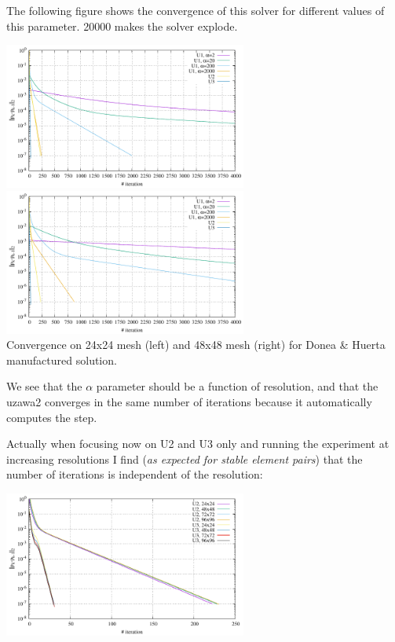 The following figure shows the convergence of this solver for different values of this parameter.
20000 makes the solver explode.	

\begin{center}
\includegraphics[width=8cm]{python_codes/fieldstone_147/RESULTS/uzawa123/convergence_24x24.pdf}
\includegraphics[width=8cm]{python_codes/fieldstone_147/RESULTS/uzawa123/convergence_48x48.pdf}\\
{\captionfont Convergence on 24x24 mesh (left) and 48x48 mesh (right) 
for Donea \& Huerta manufactured solution.}
\end{center}

We see that the $\alpha$ parameter should be a function of resolution, and that 
the uzawa2 converges in the same number of iterations because it automatically 
computes the step.


Actually when focusing now on U2 and U3 only and running the experiment at increasing resolutions I find ({\it as expected for stable element pairs}) that the number of iterations is independent of the resolution:
\begin{center}
\includegraphics[width=8cm]{python_codes/fieldstone_147/RESULTS/uzawa123/convergence_uzawa23}
\end{center}



